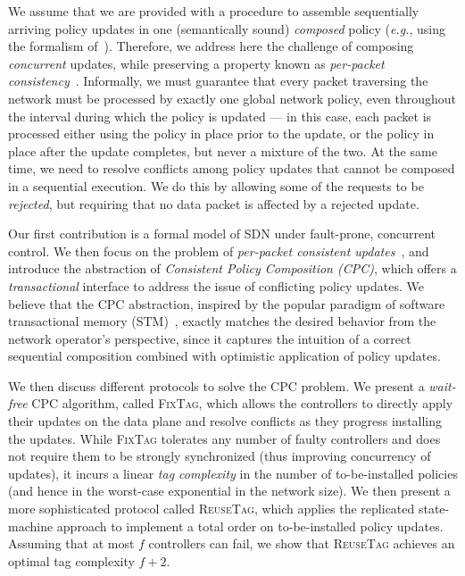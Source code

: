 \documentclass[11pt,pdftex,letter]{article}
\newcommand{\CPO}{\textsc{FixTag}}
\newcommand{\DPO}{\textsc{ReuseTag}}
\newcommand{\smartparagraph}[1]{\noindent{\bf #1}\ }
\newcommand{\eg}{{\it e.g.}}
\newcommand{\mcnote}[1]{\textcolor{heraldBlue}{\small \bf [MC: #1]}}
\newcommand{\mcnote}[1]{}
\begin{document}
We assume that we are provided with a procedure
to assemble sequentially arriving policy updates in one  (semantically
sound) \emph{composed} policy (\eg, using the formalism of~\cite{netkat}).
Therefore, we address here the challenge of composing
\emph{concurrent} updates, while preserving a property known
as \emph{per-packet consistency}~\cite{network-update}.
Informally, we must guarantee that every packet traversing the network must be processed by
exactly one global network policy, even
throughout the interval during which the policy is updated --- in this case,
each packet is processed either using the policy in place prior to the update,
or the policy in place after the update completes, but never a mixture of the
two.
At the same time, we need to resolve conflicts among policy updates that
cannot be composed in a sequential execution. We do this by allowing
some of the requests to be \emph{rejected}, but requiring that
no data packet is affected by a rejected update.

Our first contribution is a formal model
of SDN under fault-prone, concurrent control.
We then focus on the problem of
\emph{per-packet consistent updates}~\cite{network-update}, and introduce the
abstraction of \emph{Consistent Policy Composition (CPC)}, which offers a
\emph{transactional} interface to address the issue of conflicting policy
updates. We believe that the CPC abstraction, inspired by the popular paradigm
of software transactional memory (STM)~\cite{stm-st95}, exactly matches the
desired behavior from the network operator's perspective, since it captures
the intuition of a correct sequential composition combined with optimistic
application of policy updates.

We then discuss different protocols to solve the CPC problem.
We present a \emph{wait-free} CPC algorithm, called {\CPO},
which allows the controllers to directly apply their updates on the
data plane and resolve conflicts as they progress installing the updates.
While {\CPO} tolerates any number of faulty
controllers 
and does not require them to be strongly synchronized
(thus improving concurrency of updates),
it incurs a linear \emph{tag complexity} in the number of to-be-installed policies (and hence in the worst-case
 exponential in the network size).
We then present a more sophisticated protocol called {\DPO}, which
applies the replicated state-machine approach to implement
a total order on to-be-installed 
policy updates.
Assuming that at most $f$ controllers can fail, we show that {\DPO}
achieves an optimal tag complexity $f+2$.
\end{document}
